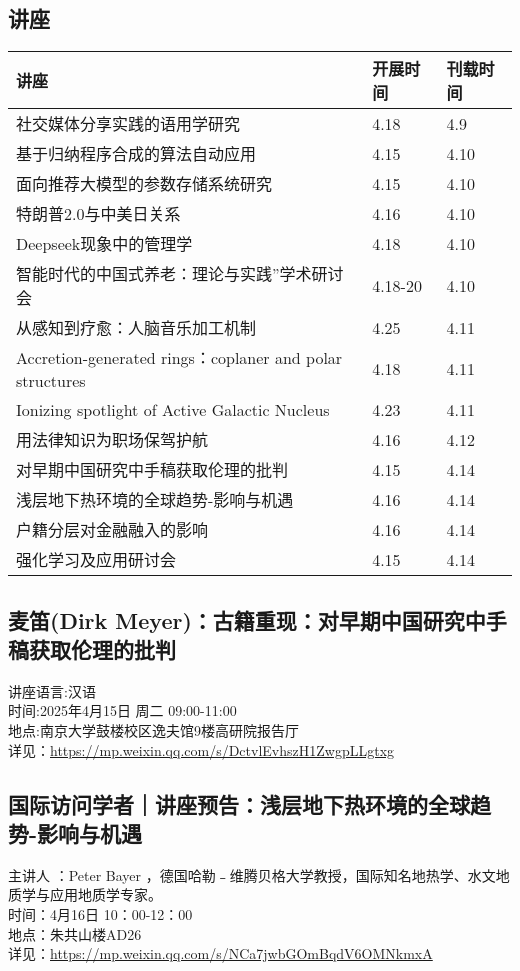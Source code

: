 \documentclass[letterpaper, 12pt]{article}
\begin{document}
\begin{multicols}{2}
\pagebreak

\section{讲座}
\begin{tabular}{|>{\centering\arraybackslash}m{}|m{}|m{}|}
    \hline
    讲座 & 开展时间 & 刊载时间\\
    \hline\hline
    社交媒体分享实践的语用学研究 & 4.18 & 4.9\\\hline
    基于归纳程序合成的算法自动应用 & 4.15 & 4.10\\\hline
    面向推荐大模型的参数存储系统研究 & 4.15 & 4.10\\\hline
    特朗普2.0与中美日关系 & 4.16 & 4.10\\\hline
    Deepseek现象中的管理学 & 4.18 & 4.10\\\hline
    智能时代的中国式养老：理论与实践”学术研讨会 & 4.18-20 & 4.10\\\hline
    从感知到疗愈：人脑音乐加工机制 & 4.25 & 4.11\\\hline
    Accretion-generated rings：coplaner and polar structures & 4.18 & 4.11\\\hline
    Ionizing spotlight of Active Galactic Nucleus & 4.23 & 4.11\\\hline
    用法律知识为职场保驾护航 & 4.16 & 4.12\\\hline
    对早期中国研究中手稿获取伦理的批判 & 4.15 & 4.14\\\hline
    浅层地下热环境的全球趋势-影响与机遇 & 4.16 & 4.14\\\hline
    户籍分层对金融融入的影响 & 4.16 & 4.14\\\hline
    强化学习及应用研讨会 & 4.15 & 4.14\\\hline
\end{tabular}
\subsection{麦笛(Dirk Meyer)：古籍重现：对早期中国研究中手稿获取伦理的批判}
讲座语言:汉语
\\时间:2025年4月15日 周二 09:00-11:00
\\地点:南京大学鼓楼校区逸夫馆9楼高研院报告厅
\\详见：\url{https://mp.weixin.qq.com/s/DctvlEvhszH1ZwgpLLgtxg}

\subsection{国际访问学者｜讲座预告：浅层地下热环境的全球趋势-影响与机遇}
主讲人 ：Peter Bayer ，德国哈勒﹣维腾贝格大学教授，国际知名地热学、水文地质学与应用地质学专家。
\\时间：4月16日 10：00-12：00    
\\地点：朱共山楼AD26
\\详见：\url{https://mp.weixin.qq.com/s/NCa7jwbGOmBqdV6OMNkmxA}


\end{multicols}
\end{document}
